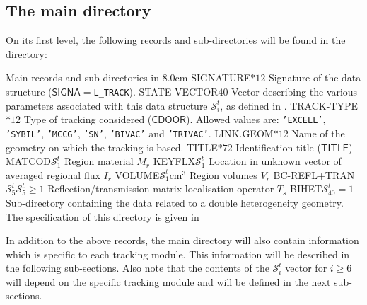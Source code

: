 \subsection{The main  directory}\label{sect:trackingdirmain}

On its first level, the
following records and sub-directories will be found in the  directory:

\begin{DescriptionEnregistrement}{Main records and sub-directories in }{8.0cm}
\CharEnr
  {SIGNATURE}{$*12$}
  {Signature of the data structure ($\mathsf{SIGNA}=${\tt L\_TRACK}).}
\IntEnr
  {STATE-VECTOR}{$40$}
  {Vector describing the various parameters associated with this data structure $\mathcal{S}^{t}_{i}$,
  as defined in .}
\CharEnr
  {TRACK-TYPE}{$*12$}
  {Type of tracking considered ($\mathsf{CDOOR}$). Allowed values are:
  {\tt 'EXCELL'}, {\tt 'SYBIL'}, {\tt 'MCCG'}, {\tt 'SN'}, {\tt 'BIVAC'} and {\tt 'TRIVAC'}.}
\CharEnr
  {LINK.GEOM}{$*12$}
  {Name of the {\sc geometry} on which the tracking is based.}
\CharEnr
  {TITLE}{$*72$}
  {Identification title ($\mathsf{TITLE}$) }
\IntEnr
  {MATCOD}{$\mathcal{S}^{t}_{1}$}
  {Region material $M_{r}$}
\IntEnr
  {KEYFLX}{$\mathcal{S}^{t}_{1}$}
  {Location in unknown vector of averaged regional flux $I_{r}$}
\RealEnr
  {VOLUME}{$\mathcal{S}^{t}_{1}$}{cm$^{3}$}
  {Region volumes $V_{r}$}
\OptIntEnr
  {BC-REFL+TRAN}{$\mathcal{S}^{t}_{5}$}{$\mathcal{S}^{t}_{5}\ge 1$}
  {Reflection/transmission matrix localisation operator $T_{s}$}
\OptDirEnr
  {BIHET}{$\mathcal{S}^{t}_{40}=1$}
  {Sub-directory containing the data related to a double heterogeneity geometry.
  The specification of this directory is given in } 
\end{DescriptionEnregistrement}

In addition to the above records, the main  directory will also contain information
which is specific to each tracking module. This information will be described in the following
sub-sections. Also note that the contents of the $\mathcal{S}^{t}_{i}$ vector for $i\ge 6$ will depend
on the specific tracking module and will be defined in the next sub-sections.

